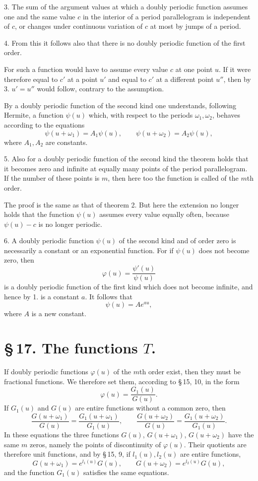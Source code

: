 \documentclass[11pt]{article}
\begin{document}
3. The sum of the argument values at which a doubly periodic function assumes one and the same value $c$ in the interior of a period parallelogram is independent of $c$, or changes under continuous variation of $c$ at most by jumps of a period.

4. From this it follows also that there is no doubly periodic function of the first order.

For such a function would have to assume every value $c$ at one point $u$. If it were therefore equal to $c'$ at a point $u'$ and equal to $c'$ at a different point $u''$, then by 3. $u'=u''$ would follow, contrary to the assumption.

By a doubly periodic function of the second kind one understands, following Hermite, a function $\psi(u)$ which, with respect to the periods $\omega_1,\omega_2$, behaves according to the equations
\[
\psi(u+\omega_1)=A_1\psi(u),\qquad
\psi(u+\omega_2)=A_2\psi(u),
\]
where $A_1,A_2$ are constants.

5. Also for a doubly periodic function of the second kind the theorem holds that it becomes zero and infinite at equally many points of the period parallelogram. If the number of these points is $m$, then here too the function is called of the $m$th order.

The proof is the same as that of theorem 2. But here the extension no longer holds that the function $\psi(u)$ assumes every value equally often, because $\psi(u)-c$ is no longer periodic.

6. A doubly periodic function $\psi(u)$ of the second kind and of order zero is necessarily a constant or an exponential function. For if $\psi(u)$ does not become zero, then
\[
\varphi(u)=\frac{\psi'(u)}{\psi(u)}
\]
is a doubly periodic function of the first kind which does not become infinite, and hence by 1. is a constant $a$. It follows that
\[
\psi(u)=Ae^{au},
\]
where $A$ is a new constant.

\section*{\S\,17. The functions $T$.}

If doubly periodic functions $\varphi(u)$ of the $m$th order exist, then they must be fractional functions. We therefore set them, according to \S\,15, 10, in the form
\begin{equation}
\varphi(u)=\frac{G_1(u)}{G(u)}.
\tag{1}
\end{equation}
If $G_1(u)$ and $G(u)$ are entire functions without a common zero, then
\[
\frac{G(u+\omega_1)}{G(u)}=\frac{G_1(u+\omega_1)}{G_1(u)},\qquad
\frac{G(u+\omega_2)}{G(u)}=\frac{G_1(u+\omega_2)}{G_1(u)}.
\]
In these equations the three functions $G(u)$, $G(u+\omega_1)$, $G(u+\omega_2)$ have the same $m$ zeros, namely the points of discontinuity of $\varphi(u)$. Their quotients are therefore unit functions, and by \S\,15, 9, if $l_1(u),l_2(u)$ are entire functions,
\begin{equation}
G(u+\omega_1)=e^{l_1(u)}G(u),\qquad
G(u+\omega_2)=e^{l_2(u)}G(u),
\tag{2}
\end{equation}
and the function $G_1(u)$ satisfies the same equations.
\end{document}
